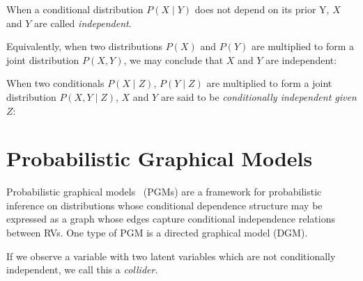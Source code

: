 \documentclass{article}
\begin{document}
When a conditional distribution $P(X \mid Y)$ does not depend on its prior Y, $X$ and $Y$ are called \textit{independent}.

\begin{prooftree}
\end{prooftree}


Equivalently, when two distributions $P(X)$ and $P(Y)$ are multiplied to form a joint distribution $P(X, Y)$, we may conclude that $X$ and $Y$ are independent:

\begin{prooftree}
\end{prooftree}

When two conditionals $P(X \mid Z)$, $P(Y \mid Z)$ are multiplied to form a joint distribution $P(X, Y \mid Z)$, $X$ and $Y$ are said to be \textit{conditionally independent given $Z$}:

\begin{prooftree}
\end{prooftree}

%
%

\section{Probabilistic Graphical Models}

Probabilistic graphical models~\citep{jordan2003introduction,koller2009probabilistic} (PGMs) are a framework for probabilistic inference on distributions whose conditional dependence structure may be expressed as a graph whose edges capture conditional independence relations between RVs. One type of PGM is a directed graphical model (DGM).

If we observe a variable with two latent variables which are not conditionally independent, we call this a \textit{collider}.

\begin{prooftree}
\end{prooftree}
\end{document}

